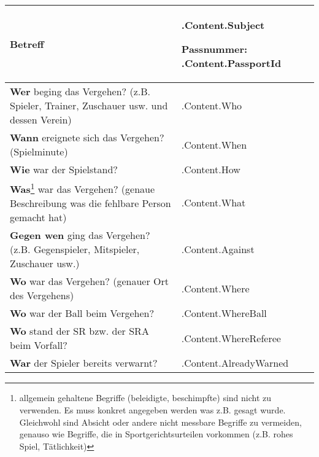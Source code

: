 \documentclass[a4paper, 11pt]{article}
\begin{document}
    \def\arraystretch{1.2}
    \begin{longtable}[]{@{}
        |>{\raggedright\arraybackslash}p{}
        |>{\raggedright\arraybackslash}p{}|@{}}
        \hline
        \endhead
        \textbf{Betreff} & \textbf{ {{ .Content.Subject }} }

        \textbf{Passnummer: {{ .Content.PassportId }}} \\\hline
        \textbf{Wer} beging das Vergehen? (z.B. Spieler, Trainer, Zuschauer usw. und dessen Verein) & {{ .Content.Who }} \\\hline
        \textbf{Wann} ereignete sich das Vergehen? (Spielminute)                                                                 & {{ .Content.When }}          \\\hline
        \textbf{Wie} war der Spielstand?                                                                                         & {{ .Content.How }}           \\\hline
        \textbf{Was}\footnote{allgemein gehaltene Begriffe (beleidigte,
            beschimpfte) sind nicht zu verwenden. Es muss konkret angegeben werden
            was z.B. gesagt wurde. Gleichwohl sind Absicht oder andere nicht
            messbare Begriffe zu vermeiden, genauso wie Begriffe, die in
            Sportgerichtsurteilen vorkommen (z.B. rohes Spiel, Tätlichkeit)}
        war das Vergehen? (genaue Beschreibung was die fehlbare Person gemacht hat)                                              & {{ .Content.What }}          \\\hline
        \textbf{Gegen wen} ging das Vergehen? (z.B. Gegenspieler, Mitspieler, Zuschauer usw.) & {{ .Content.Against }} \\\hline
        \textbf{Wo} war das Vergehen? (genauer Ort des Vergehens)                                                                & {{ .Content.Where }}         \\\hline
        \textbf{Wo} war der Ball beim Vergehen?                                                                                  & {{ .Content.WhereBall }}     \\\hline
        \textbf{Wo} stand der SR bzw. der SRA beim Vorfall?                                                                      & {{ .Content.WhereReferee }}  \\\hline
        \textbf{War} der Spieler bereits verwarnt?                                                                               & {{ .Content.AlreadyWarned }} \\\hline

\end{longtable}
\end{document}
